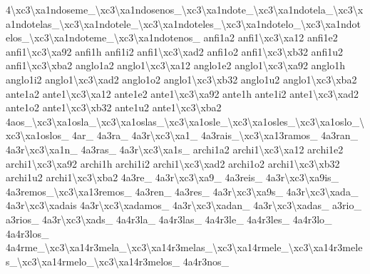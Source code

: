 {4\textbackslash{}xc3\textbackslash{}xa1ndoseme\-\_\textbackslash{}xc3\textbackslash{}xa1ndosenos\-\_\textbackslash{}xc3\textbackslash{}xa1ndote\-\_\textbackslash{}xc3\textbackslash{}xa1ndotela\-\_\textbackslash{}xc3\textbackslash{}xa1ndotelas\-\_\textbackslash{}xc3\textbackslash{}xa1ndotele\-\_\textbackslash{}xc3\textbackslash{}xa1ndoteles\-\_\textbackslash{}xc3\textbackslash{}xa1ndotelo\-\_\textbackslash{}xc3\textbackslash{}xa1ndotelos\-\_\textbackslash{}xc3\textbackslash{}xa1ndoteme\-\_\textbackslash{}xc3\textbackslash{}xa1ndotenos\-\_\- anfi1a2 anfi1\textbackslash{}xc3\textbackslash{}xa12 anfi1e2 anfi1\textbackslash{}xc3\textbackslash{}xa92 anfi1h anfi1i2 anfi1\textbackslash{}xc3\textbackslash{}xad2 anfi1o2 anfi1\textbackslash{}xc3\textbackslash{}xb32 anfi1u2 anfi1\textbackslash{}xc3\textbackslash{}xba2 anglo1a2 anglo1\textbackslash{}xc3\textbackslash{}xa12 anglo1e2 anglo1\textbackslash{}xc3\textbackslash{}xa92 anglo1h anglo1i2 anglo1\textbackslash{}xc3\textbackslash{}xad2 anglo1o2 anglo1\textbackslash{}xc3\textbackslash{}xb32 anglo1u2 anglo1\textbackslash{}xc3\textbackslash{}xba2 ante1a2 ante1\textbackslash{}xc3\textbackslash{}xa12 ante1e2 ante1\textbackslash{}xc3\textbackslash{}xa92 ante1h ante1i2 ante1\textbackslash{}xc3\textbackslash{}xad2 ante1o2 ante1\textbackslash{}xc3\textbackslash{}xb32 ante1u2 ante1\textbackslash{}xc3\textbackslash{}xba2 4aos\-\_\textbackslash{}xc3\textbackslash{}xa1osla\-\_\textbackslash{}xc3\textbackslash{}xa1oslas\-\_\textbackslash{}xc3\textbackslash{}xa1osle\-\_\textbackslash{}xc3\textbackslash{}xa1osles\-\_\textbackslash{}xc3\textbackslash{}xa1oslo\-\_\textbackslash{}xc3\textbackslash{}xa1oslos\-\_\- 4ar\-\_\- 4a3ra\-\_\- 4a3r\textbackslash{}xc3\textbackslash{}xa1\-\_\- 4a3rais\-\_\textbackslash{}xc3\textbackslash{}xa13ramos\-\_\- 4a3ran\-\_\- 4a3r\textbackslash{}xc3\textbackslash{}xa1n\-\_\- 4a3ras\-\_\- 4a3r\textbackslash{}xc3\textbackslash{}xa1s\-\_\- archi1a2 archi1\textbackslash{}xc3\textbackslash{}xa12 archi1e2 archi1\textbackslash{}xc3\textbackslash{}xa92 archi1h archi1i2 archi1\textbackslash{}xc3\textbackslash{}xad2 archi1o2 archi1\textbackslash{}xc3\textbackslash{}xb32 archi1u2 archi1\textbackslash{}xc3\textbackslash{}xba2 4a3re\-\_\- 4a3r\textbackslash{}xc3\textbackslash{}xa9\-\_\- 4a3reis\-\_\- 4a3r\textbackslash{}xc3\textbackslash{}xa9is\-\_\- 4a3remos\-\_\textbackslash{}xc3\textbackslash{}xa13remos\-\_\- 4a3ren\-\_\- 4a3res\-\_\- 4a3r\textbackslash{}xc3\textbackslash{}xa9s\-\_\- 4a3r\textbackslash{}xc3\textbackslash{}xada\-\_\- 4a3r\textbackslash{}xc3\textbackslash{}xadais 4a3r\textbackslash{}xc3\textbackslash{}xadamos\-\_\- 4a3r\textbackslash{}xc3\textbackslash{}xadan\-\_\- 4a3r\textbackslash{}xc3\textbackslash{}xadas\-\_\- a3rio\-\_\- a3rios\-\_\- 4a3r\textbackslash{}xc3\textbackslash{}xads\-\_\- 4a4r3la\-\_\- 4a4r3las\-\_\- 4a4r3le\-\_\- 4a4r3les\-\_\- 4a4r3lo\-\_\- 4a4r3los\-\_\- 4a4rme\-\_\textbackslash{}xc3\textbackslash{}xa14r3mela\-\_\textbackslash{}xc3\textbackslash{}xa14r3melas\-\_\textbackslash{}xc3\textbackslash{}xa14rmele\-\_\textbackslash{}xc3\textbackslash{}xa14r3meles\-\_\textbackslash{}xc3\textbackslash{}xa14rmelo\-\_\textbackslash{}xc3\textbackslash{}xa14r3melos\-\_\- 4a4r3nos\-\_\- }
